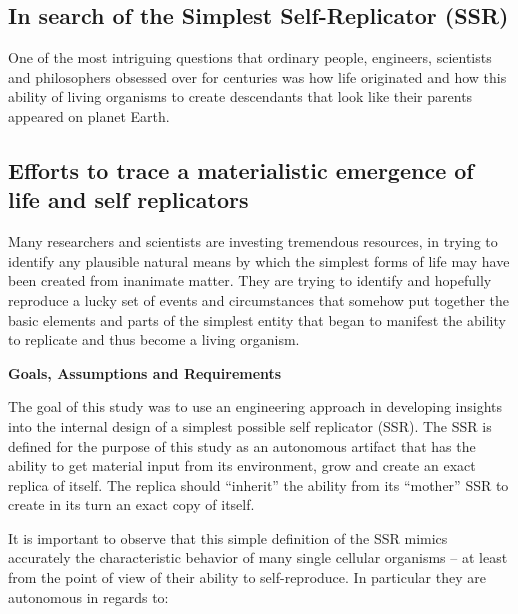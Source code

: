 \bigskip

\subsection[In search of the Simplest Self{}-Replicator (SSR)]{In search
of the Simplest Self-Replicator (SSR)}
\hypertarget{RefHeading3038306210128}{}
\bigskip

One of the most intriguing questions that ordinary people, engineers,
scientists and philosophers obsessed over for centuries was how life
originated and how this ability of living organisms to create
descendants that look like their parents appeared on planet Earth. 


\bigskip

\subsection[Efforts to trace a materialistic emergence of life and self
replicators]{Efforts to trace a materialistic emergence of life and
self replicators}
\hypertarget{RefHeading3040306210128}{}Many researchers and scientists
are investing tremendous resources, in trying to identify any plausible
natural means by which the simplest forms of life may have been created
from inanimate matter. They are trying to identify and hopefully
reproduce a lucky set of events and circumstances that somehow put
together the basic elements and parts of the simplest entity that began
to manifest the ability to replicate and thus become a living organism.


\bigskip

{\bfseries
\hypertarget{RefHeading3042306210128}{}Goals, Assumptions and
Requirements}

The goal of this study was to use an engineering approach in developing
insights into the internal design of a simplest possible self
replicator (SSR). The SSR is defined for the purpose of this study as
an autonomous artifact that has the ability to get material input from
its environment, grow and create an exact replica of itself. The
replica should “inherit” the ability from its “mother” SSR to create in
its turn an exact copy of itself.


\bigskip

It is important to observe that this simple definition of the SSR mimics
accurately the characteristic behavior of many single cellular
organisms – at least from the point of view of their ability to
self-reproduce. In particular they are autonomous in regards to:


